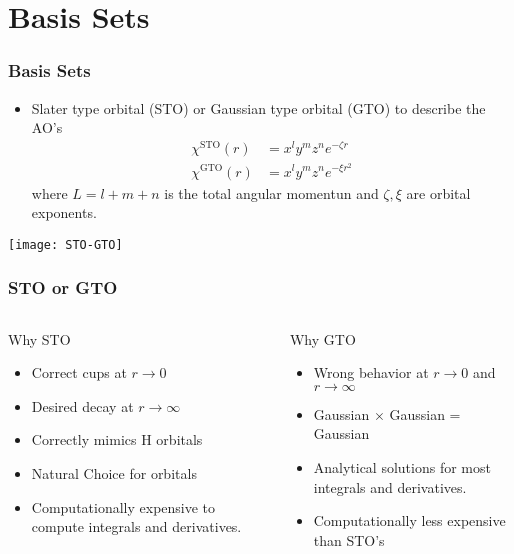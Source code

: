 \documentclass[slidestop,mathserif,compress,xcolor=svgnames]{beamer}
\begin{document}
\section{Basis Sets}
\begin{frame}
  \frametitle{\small Basis Sets}
  \begin{itemize}
    \item %
      Slater type orbital (STO) or Gaussian type orbital (GTO) to describe the AO's
    \begin{align*}
      \chi^{\mathrm{STO}}(r) &= x^ly^mz^ne^{-\zeta r}\\
      \chi^{\mathrm{GTO}}(r) &= x^ly^mz^ne^{-\xi r^2}
    \end{align*}
    where $L=l+m+n$ is the total angular momentun and $\zeta,\xi$ are orbital exponents. 
  \end{itemize}
  \begin{center}
    \texttt{[image: STO-GTO]}
  \end{center}
\end{frame}

\begin{frame}
  \frametitle{\small STO or GTO}
  \begin{columns}
    \column{5.5cm}
    \vspace{-0.2cm}
    \begin{block}{Why STO}
      \begin{itemize}
	\item Correct cups at $r\rightarrow0$
	\item Desired decay at $r\rightarrow\infty$ 
	\item Correctly mimics H orbitals
	\item Natural Choice for orbitals
	\item Computationally expensive to compute integrals and derivatives.
      \end{itemize}
    \end{block}
    \column{5.5cm}
    \vspace{-0.2cm}
    \begin{block}{Why GTO}
      \begin{itemize}
	\item Wrong behavior at $r\rightarrow0$ and $r\rightarrow\infty$
	\item Gaussian $\times$ Gaussian = Gaussian
	\item Analytical solutions for most integrals and derivatives.
	\item Computationally less expensive than STO's
      \end{itemize}
    \end{block}
  \end{columns}
\end{frame}
\end{document}
